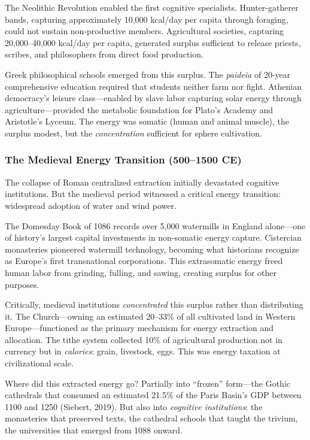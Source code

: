The Neolithic Revolution enabled the first cognitive specialists. Hunter-gatherer bands, capturing approximately 10,000 kcal/day per capita through foraging, could not sustain non-productive members. Agricultural societies, capturing 20,000--40,000 kcal/day per capita, generated surplus sufficient to release priests, scribes, and philosophers from direct food production.

Greek philosophical schools emerged from this surplus. The \textit{paideia} of 20-year comprehensive education required that students neither farm nor fight. Athenian democracy's leisure class---enabled by slave labor capturing solar energy through agriculture---provided the metabolic foundation for Plato's Academy and Aristotle's Lyceum. The energy was somatic (human and animal muscle), the surplus modest, but the \textit{concentration} sufficient for sphere cultivation.

\subsubsection{The Medieval Energy Transition (500--1500 CE)}

The collapse of Roman centralized extraction initially devastated cognitive institutions. But the medieval period witnessed a critical energy transition: widespread adoption of water and wind power.

The Domesday Book of 1086 records over 5,000 watermills in England alone---one of history's largest capital investments in non-somatic energy capture. Cistercian monasteries pioneered watermill technology, becoming what historians recognize as Europe's first transnational corporations. This extrasomatic energy freed human labor from grinding, fulling, and sawing, creating surplus for other purposes.

Critically, medieval institutions \textit{concentrated} this surplus rather than distributing it. The Church---owning an estimated 20--33\% of all cultivated land in Western Europe---functioned as the primary mechanism for energy extraction and allocation. The tithe system collected 10\% of agricultural production not in currency but in \textit{calories}: grain, livestock, eggs. This was energy taxation at civilizational scale.

Where did this extracted energy go? Partially into ``frozen'' form---the Gothic cathedrals that consumed an estimated 21.5\% of the Paris Basin's GDP between 1100 and 1250 (Siebert, 2019). But also into \textit{cognitive institutions}: the monasteries that preserved texts, the cathedral schools that taught the trivium, the universities that emerged from 1088 onward.

